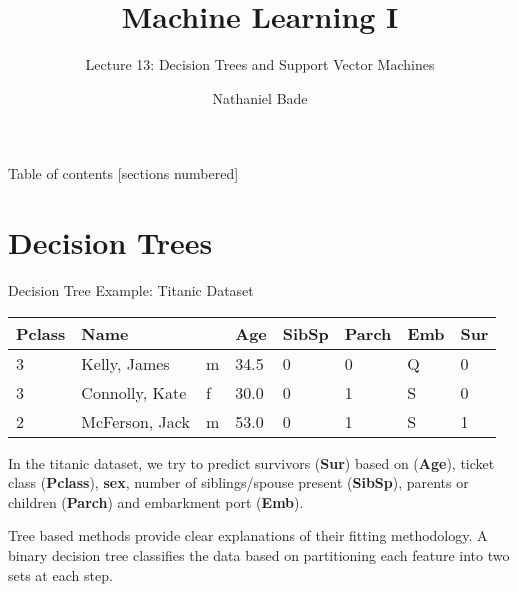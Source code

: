 \documentclass[10pt, table, dvipsnames,xcdraw]{beamer}
\title{Machine Learning I}
\subtitle{Lecture 13: Decision Trees and Support Vector Machines}
\date{}
\author{Nathaniel Bade}
\institute{Northeastern University Department of Mathematics}
\begin{document}
\maketitle

\begin{frame}{Table of contents}
  [sections numbered]
  \tableofcontents[hideallsubsections]
\end{frame}





\section{Decision Trees}

\begin{frame}[fragile]{Decision Tree Example: Titanic Dataset}
\begin{table}[]
\begin{tabular}{|l|l|l|l|l|l|l|l|}
\hline
\rowcolor[HTML]{656565} 
{\color[HTML]{EFEFEF} Pclass} & {\color[HTML]{EFEFEF} Name} & \multicolumn{1}{c|}{\cellcolor[HTML]{656565}{\color[HTML]{EFEFEF} Sex}} & {\color[HTML]{EFEFEF} Age} & {\color[HTML]{EFEFEF} SibSp} & {\color[HTML]{EFEFEF} Parch}  & {\color[HTML]{FFFFFF} Emb} & {\color[HTML]{FFFFFF} Sur} \\ \hline
3                             & Kelly, James            & m                                                                       & 34.5                       & 0                            & 0                                                & Q    & 0                           \\ \hline
3                             & Connolly, Kate        & f                                                                       & 30.0                       & 0                            & 1                                                 & S    & 0                           \\ \hline
2                             & McFerson, Jack        & m                                                                       & 53.0                       & 0                            & 1                                                 & S    & 1                           \\ \hline
\end{tabular}
\end{table}
  \vfill
\begin{minipage}[t][0.5\textheight][t]{\textwidth}
In the titanic dataset, we try to predict survivors (\textbf{Sur}) based on (\textbf{Age}), ticket class (\textbf{Pclass}), \textbf{sex}, number of siblings/spouse present (\textbf{SibSp}), parents or children (\textbf{Parch}) and embarkment port (\textbf{Emb}). \pause \newline 

Tree based methods provide clear explanations of their fitting methodology. A binary decision tree classifies the data based on partitioning each feature into two sets at each step. 
\end{minipage}
\end{frame}
\end{document}
